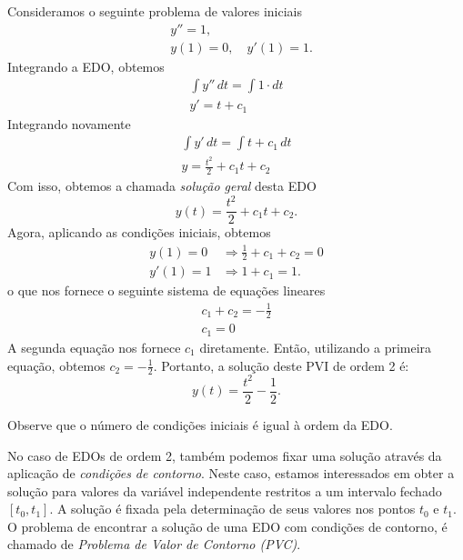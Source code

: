\begin{ex}
Consideramos o seguinte problema de valores iniciais
\begin{align}
  &y'' = 1,\\
  &y(1) = 0,\quad y'(1) = 1.
\end{align}
Integrando a EDO, obtemos
\begin{gather}
  \int y''\,dt = \int 1\cdot dt\\
  y' = t + c_1
\end{gather}
Integrando novamente
\begin{gather}
  \int y'\,dt = \int t + c_1\,dt\\
  y = \frac{t^2}{2} + c_1t + c_2
\end{gather}
Com isso, obtemos a chamada \emph{solução geral} desta EDO
\begin{equation}
  y(t) = \frac{t^2}{2} + c_1t + c_2.
\end{equation}
Agora, aplicando as condições iniciais, obtemos
\begin{align}
  y(1) = 0 &\Rightarrow \frac{1}{2} + c_1 + c_2 = 0\\
  y'(1) = 1 &\Rightarrow 1 + c_1 = 1.
\end{align}
o que nos fornece o seguinte sistema de equações lineares
\begin{gather}
  c_1 + c_2 = -\frac{1}{2}\\
  c_1 = 0
\end{gather}
A segunda equação nos fornece $c_1$ diretamente. Então, utilizando a primeira equação, obtemos $c_2 = -\frac{1}{2}$. Portanto, a solução deste PVI de ordem 2 é:
\begin{equation}
  y(t) = \frac{t^2}{2} - \frac{1}{2}.
\end{equation}
\end{ex}


\begin{obs}
  Observe que o número de condições iniciais é igual à ordem da EDO.
\end{obs}

No caso de EDOs de ordem 2, também podemos fixar uma solução através da aplicação de \emph{condições de contorno}. Neste caso, estamos interessados em obter a solução para valores da variável independente restritos a um intervalo fechado $[t_0, t_1]$. A solução é fixada pela determinação de seus valores nos pontos $t_0$ e $t_1$. O problema de encontrar a solução de uma EDO com condições de contorno, é chamado de \emph{Problema de Valor de Contorno (PVC)}.

